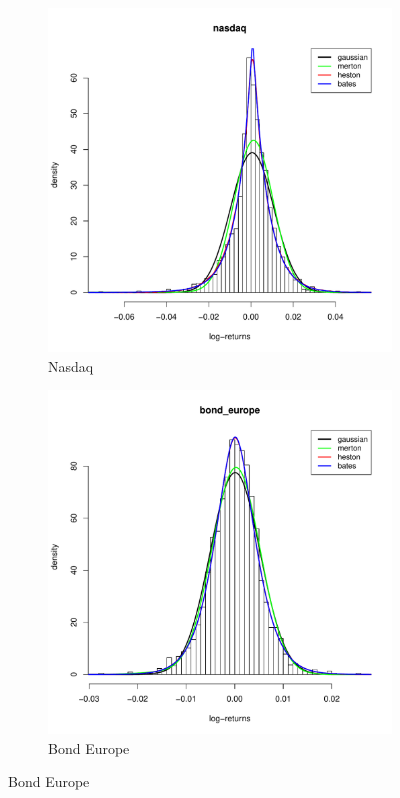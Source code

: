 \begin{figure}
	\small
	\centering
	\begin{subfigure}{0.44\textwidth}
		\centering
		\includegraphics[width=\linewidth]{Images/hist_nasdaq.pdf}
		\caption{Nasdaq}
	\end{subfigure}
	\begin{subfigure}{0.44\textwidth}
		\centering
		\includegraphics[width=\linewidth]{Images/hist_bond_europe.pdf}
		\caption{Bond Europe}
	\end{subfigure}


\end{figure}
